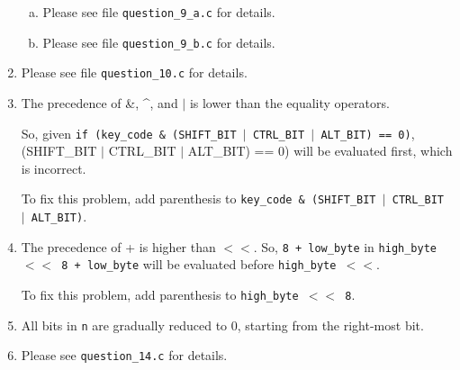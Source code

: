 \documentclass[12pt]{article}
\begin{document}
\begin{enumerate}[1.]
    \begin{enumerate}[a)]
        \item

        Please see file \texttt{question\_9\_a.c} for details.

        \item

        Please see file \texttt{question\_9\_b.c} for details.
    \end{enumerate}

    \item

    Please see file \texttt{question\_10.c} for details.

    \item

    The precedence of \&, \^{}, and $\vert$ is lower than the equality operators.

    \bigskip

    So, given \texttt{if (key\_code \& (SHIFT\_BIT $\vert$ CTRL\_BIT $\vert$ ALT\_BIT) == 0)},
    (SHIFT\_BIT $\vert$ CTRL\_BIT $\vert$ ALT\_BIT) == 0) will be evaluated first, which is incorrect.

    \bigskip

    To fix this problem, add parenthesis to \texttt{key\_code \& (SHIFT\_BIT $\vert$ CTRL\_BIT $\vert$ ALT\_BIT)}.

    \item

    The precedence of + is higher than $<<$. So, \texttt{8 + low\_byte} in
    \texttt{high\_byte $<<$ 8 + low\_byte} will be evaluated before \texttt{high\_byte $<<$}.

    \bigskip

    To fix this problem, add parenthesis to \texttt{high\_byte $<<$ 8}.

    \item

    All bits in \texttt{n} are gradually reduced to 0, starting from the right-most bit.

    \item

    Please see \texttt{question\_14.c} for details.

\end{enumerate}
\end{document}
